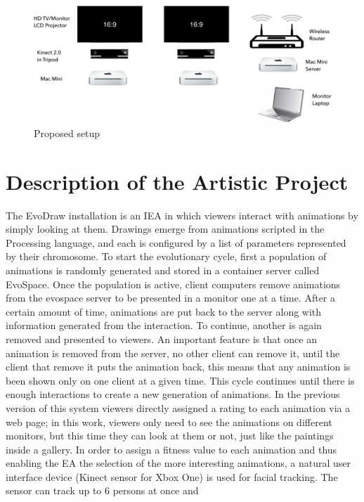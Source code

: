 \documentclass[letterpaper]{article}
\begin{document}
\label{Description}
\begin{figure}[!t]
\centering
\includegraphics[width=6in]{EvoDrawTech.pdf}
\caption{Proposed setup}
\label{fig:system}
\end{figure}

\section{Description of the Artistic Project} 
The EvoDraw installation is an IEA in which viewers interact with animations by simply
looking at them. Drawings emerge from animations scripted in the Processing 
language, and each is configured by a list of parameters represented by their
chromosome. To start the evolutionary cycle, first a population of animations is 
randomly generated and stored in a container server called EvoSpace. Once the population is active, 
client computers remove animations from the evospace server to be presented in a monitor
one at a time. After a certain amount of time, animations are put back to the server along 
with information generated from the interaction. To continue, another is again removed and presented
to viewers. An important feature is that once an animation is removed from the server,
no other client can remove it, until the client that remove it puts the animation back, this means that any
animation is been shown only
on one client at a given time. This cycle continues until there is enough interactions to create a new
generation of animations. In the previous version of this system \citep{garcia2013evospace} 
viewers directly assigned a rating to each animation via a web page; in this work, viewers
only need to see the animations on different monitors, but this time they can look at them or not, just like
the paintings inside a gallery. In order to assign a fitness value to each animation and thus 
enabling the EA the selection of the more interesting animations, 
a natural user interface device (Kinect sensor for Xbox One)
is used for facial tracking. The sensor can track up to 6 persons at once and  
\end{document}
